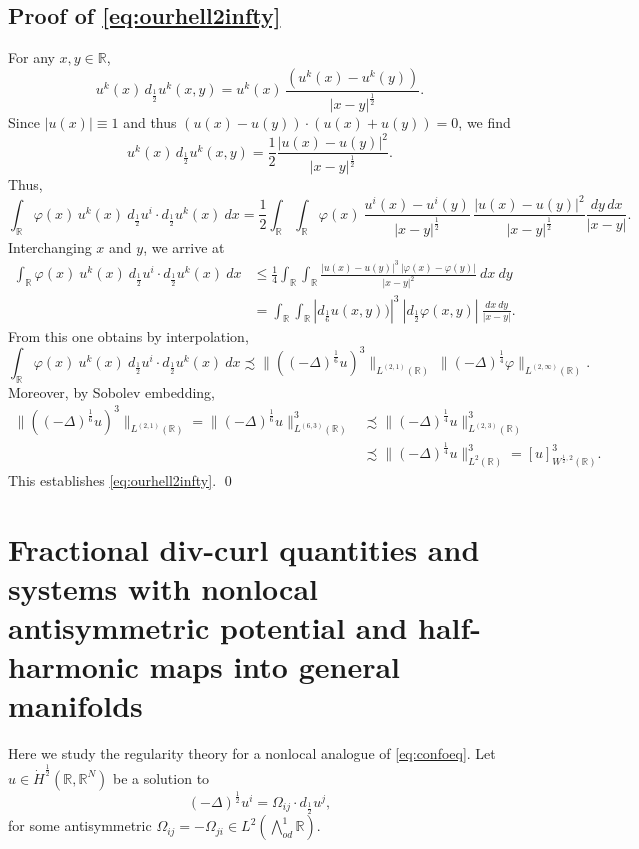 \documentclass[12pt]{amsart}
\theoremstyle{definition}
\newcommand{\R}{\mathbb{R}}
\newcommand{\Ep}{\bigwedge\nolimits}
\numberwithin{theorem}{section} \numberwithin{equation}{section}
\newcommand{\lap}{\Delta }
\newcommand{\aleq}{\precsim}
\newcommand{\lapv}{(-\lap)^{\frac{1}{4}}}
\newcommand{\laph}{(-\lap)^{\frac{1}{2}}}
\begin{document}
\subsection{Proof of \eqref{eq:ourhell2infty}}
For any $x,y \in \R$,
\[
 u^k(x)\, d_{\frac{1}{2}}u^k(x,y) = u^k(x)\, \frac{(u^k(x)-u^k(y))}{|x-y|^{\frac{1}{2}}}.
\]
Since $|u(x)| \equiv 1$ and thus $(u(x)-u(y))\cdot(u(x)+u(y)) = 0$, we find
\[
 u^k(x)\, d_{\frac{1}{2}}u^k(x,y) = \frac{1}{2} \frac{|u(x)-u(y)|^2}{|x-y|^{\frac{1}{2}}}.
\]
Thus,
\[
 \int_{\R} \varphi(x)\, u^k(x)\ d_{\frac{1}{2}} u^i\cdot d_{\frac{1}{2}}u^k(x)\ dx =\frac{1}{2} \int_{\R}\int_{\R} \varphi(x)\  \frac{u^i(x)-u^i(y)}{|x-y|^{\frac{1}{2}}}\, \frac{|u(x)-u(y)|^2}{|x-y|^{\frac{1}{2}}} \frac{dy\, dx}{|x-y|}.
 \]
Interchanging $x$ and $y$, we arrive at
\[
\begin{split}
 \int_{\R} \varphi(x)\ u^k(x)\ d_{\frac{1}{2}} u^i\cdot d_{\frac{1}{2}}u^k(x)\ dx
 &\leq \frac{1}{4} \int_{\R} \int_{\R}\frac{|u(x)-u(y)|^3\ |\varphi(x)-\varphi(y)|}{|x-y|^{2}}\ dx\ dy\\
 &=\int_{\R} \int_{\R} |d_{\frac{1}{6}}u(x,y))|^3\ |d_{\frac{1}{2}}\varphi(x,y)|\ \frac{dx\ dy}{|x-y|}.
\end{split}
 \]
From this one obtains by interpolation,
\[
 \int_{\R} \varphi(x)\ u^k(x)\ d_{\frac{1}{2}} u^i\cdot d_{\frac{1}{2}}u^k(x)\ dx \aleq \|((-\lap)^{\frac{1}{6}} u)^3\|_{L^{(2,1)}(\R)}\ \|\lapv \varphi\|_{L^{(2,\infty)}(\R)}.
\]
Moreover, by Sobolev embedding,
\[
\begin{split}
 \|((-\lap)^{\frac{1}{6}} u)^3\|_{L^{(2,1)}(\R)} = \|(-\lap)^{\frac{1}{6}} u\|_{L^{(6,3)}(\R)}^3 &\aleq \|\lapv u\|_{L^{(2,3)}(\R)}^3\\
 &\aleq \|\lapv u\|_{L^2(\R)}^3 = [u]_{W^{\frac{1}{2},2}(\R)}^3.
 \end{split}
\]
This establishes \eqref{eq:ourhell2infty}.
\qed



\section{Fractional   div-curl quantities and systems with nonlocal antisymmetric potential and half-harmonic maps into general manifolds}\label{s:antisym}
Here we study the regularity theory for a nonlocal analogue of \eqref{eq:confoeq}. Let $u \in \dot{H}^{\frac{1}{2}}(\R,\R^N)$ be a solution to
\begin{equation}\label{eq:nlocantisym}
 \laph u^i = \Omega_{ij} \cdot d_{\frac12} u^j,
\end{equation}
for some antisymmetric $\Omega_{ij} = -\Omega_{ji} \in L^2(\Ep^1_{od} \R)$.
\end{document}

